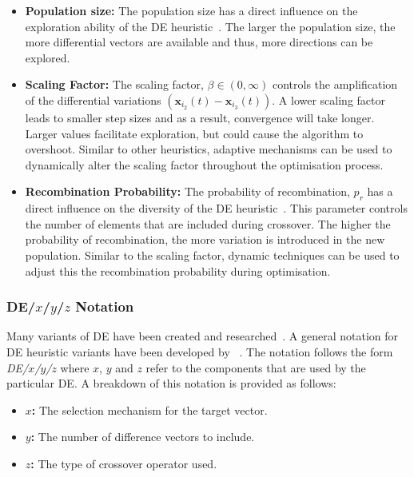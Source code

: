 \begin{itemize}
      \item \textbf{Population size:} The population size has a direct influence on the exploration ability of the \acs{DE} heuristic~\cite{ref:engelbrecht:2007}. The larger the population size, the more differential vectors are available and thus, more directions can be explored.

      \item \textbf{Scaling Factor:} The scaling factor, $\beta \in (0, \infty)$ controls the amplification of the differential variations $(\boldsymbol{x}_{i_{2}}(t) - \boldsymbol{x}_{i_{3}}(t))$. A lower scaling factor leads to smaller step sizes and as a result, convergence will take longer. Larger values facilitate exploration, but could cause the algorithm to overshoot. Similar to other heuristics, adaptive mechanisms can be used to dynamically alter the scaling factor throughout the optimisation process.

      \item \textbf{Recombination Probability:} The probability of recombination, $p_{r}$ has a direct influence on the diversity of the \acs{DE} heuristic~\cite{ref:engelbrecht:2007}. This parameter controls the number of elements that are included during crossover. The higher the probability of recombination, the more variation is introduced in the new population. Similar to the scaling factor, dynamic techniques can be used to adjust this the recombination probability during optimisation.
\end{itemize}

\subsubsection{DE/$x$/$y$/$z$ Notation}

Many variants of \acs{DE} have been created and researched~\cite{ref:mezura:2006}. A general notation for \acs{DE} heuristic variants have been developed by \citeauthor{ref:storn:1996}~\cite{ref:storn:1996, ref:storn:1997}. The notation follows the form \textit{DE/$x$/$y$/$z$} where $x$, $y$ and $z$ refer to the components that are used by the particular \acs{DE}. A breakdown of this notation is provided as follows:

\begin{itemize}
      \item \textbf{$x$:} The selection mechanism for the target vector.
      \item \textbf{$y$:} The number of difference vectors to include.
      \item \textbf{$z$:} The type of crossover operator used.
\end{itemize}

